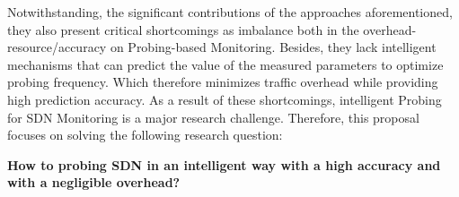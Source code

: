 Notwithstanding, the significant contributions of the approaches aforementioned, they also present critical shortcomings as imbalance both in the overhead-resource/accuracy on Probing-based Monitoring. Besides, they lack intelligent mechanisms that can predict the value of the measured parameters to optimize probing frequency. Which therefore minimizes traffic overhead while providing high prediction accuracy. As a result of these shortcomings, intelligent Probing for SDN Monitoring is a major research challenge. Therefore, this proposal focuses on solving the following research question:


\begin{center}
\textbf{How to probing SDN in an intelligent way with a high accuracy and with a negligible overhead?}
\end{center}